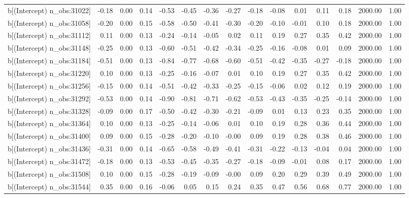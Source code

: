 \begin{table}[ht]
\begin{tabular}{rrrrrrrrrrrrrrr}
  b[(Intercept) n\_obs:31022] & -0.18 & 0.00 & 0.14 & -0.53 & -0.45 & -0.36 & -0.27 & -0.18 & -0.08 & 0.01 & 0.11 & 0.18 & 2000.00 & 1.00 \\ 
  b[(Intercept) n\_obs:31058] & -0.20 & 0.00 & 0.15 & -0.58 & -0.50 & -0.41 & -0.30 & -0.20 & -0.10 & -0.01 & 0.10 & 0.18 & 2000.00 & 1.00 \\ 
  b[(Intercept) n\_obs:31112] & 0.11 & 0.00 & 0.13 & -0.24 & -0.14 & -0.05 & 0.02 & 0.11 & 0.19 & 0.27 & 0.35 & 0.42 & 2000.00 & 1.00 \\ 
  b[(Intercept) n\_obs:31148] & -0.25 & 0.00 & 0.13 & -0.60 & -0.51 & -0.42 & -0.34 & -0.25 & -0.16 & -0.08 & 0.01 & 0.09 & 2000.00 & 1.00 \\ 
  b[(Intercept) n\_obs:31184] & -0.51 & 0.00 & 0.13 & -0.84 & -0.77 & -0.68 & -0.60 & -0.51 & -0.42 & -0.35 & -0.27 & -0.18 & 2000.00 & 1.00 \\ 
  b[(Intercept) n\_obs:31220] & 0.10 & 0.00 & 0.13 & -0.25 & -0.16 & -0.07 & 0.01 & 0.10 & 0.19 & 0.27 & 0.35 & 0.42 & 2000.00 & 1.00 \\ 
  b[(Intercept) n\_obs:31256] & -0.15 & 0.00 & 0.14 & -0.51 & -0.42 & -0.33 & -0.25 & -0.15 & -0.06 & 0.02 & 0.12 & 0.19 & 2000.00 & 1.00 \\ 
  b[(Intercept) n\_obs:31292] & -0.53 & 0.00 & 0.14 & -0.90 & -0.81 & -0.71 & -0.62 & -0.53 & -0.43 & -0.35 & -0.25 & -0.14 & 2000.00 & 1.00 \\ 
  b[(Intercept) n\_obs:31328] & -0.09 & 0.00 & 0.17 & -0.50 & -0.42 & -0.30 & -0.21 & -0.09 & 0.01 & 0.13 & 0.23 & 0.35 & 2000.00 & 1.00 \\ 
  b[(Intercept) n\_obs:31364] & 0.10 & 0.00 & 0.13 & -0.25 & -0.14 & -0.06 & 0.01 & 0.10 & 0.19 & 0.28 & 0.36 & 0.44 & 2000.00 & 1.00 \\ 
  b[(Intercept) n\_obs:31400] & 0.09 & 0.00 & 0.15 & -0.28 & -0.20 & -0.10 & -0.00 & 0.09 & 0.19 & 0.28 & 0.38 & 0.46 & 2000.00 & 1.00 \\ 
  b[(Intercept) n\_obs:31436] & -0.31 & 0.00 & 0.14 & -0.65 & -0.58 & -0.49 & -0.41 & -0.31 & -0.22 & -0.13 & -0.04 & 0.04 & 2000.00 & 1.00 \\ 
  b[(Intercept) n\_obs:31472] & -0.18 & 0.00 & 0.13 & -0.53 & -0.45 & -0.35 & -0.27 & -0.18 & -0.09 & -0.01 & 0.08 & 0.17 & 2000.00 & 1.00 \\ 
  b[(Intercept) n\_obs:31508] & 0.10 & 0.00 & 0.15 & -0.28 & -0.19 & -0.09 & -0.00 & 0.09 & 0.20 & 0.29 & 0.39 & 0.49 & 2000.00 & 1.00 \\ 
  b[(Intercept) n\_obs:31544] & 0.35 & 0.00 & 0.16 & -0.06 & 0.05 & 0.15 & 0.24 & 0.35 & 0.47 & 0.56 & 0.68 & 0.77 & 2000.00 & 1.00 \\ 

\end{tabular}
\end{table}

